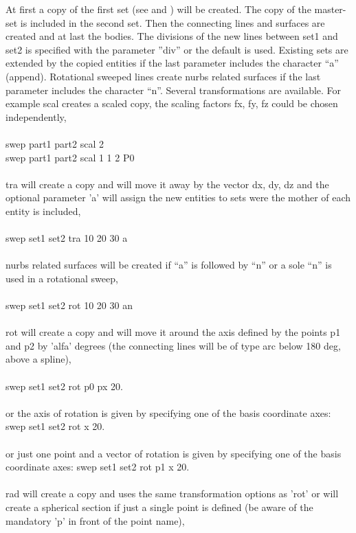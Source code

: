 \documentclass{article}
\begin{document}
At first a copy of the first set (see  and ) will be created. The copy of the master-set is included in the second set. Then the connecting lines and surfaces are created and at last the bodies. The divisions of the new lines between set1 and set2 is specified with the parameter ''div'' or the default is used. Existing sets are extended by the copied entities if the last parameter includes the character ``a'' (append). Rotational sweeped lines create nurbs related surfaces if the last parameter includes the character ``n''. Several transformations are available. For example scal creates a scaled copy, the scaling factors fx, fy, fz could be chosen independently,\\\\
swep part1 part2 scal 2 \\
swep part1 part2 scal 1 1 2 P0\\\\
tra will create a copy and will move it away by the vector dx, dy, dz and the optional parameter 'a' will assign the new entities to sets were the mother of each entity is included,\\\\
swep set1 set2 tra 10 20 30 a\\\\
nurbs related surfaces will be created if ``a'' is followed by ``n'' or a sole ``n'' is used in a rotational sweep,\\\\ 
swep set1 set2 rot 10 20 30 an\\\\
rot will create a copy and will move it around the axis defined by the points p1 and p2 by 'alfa' degrees (the connecting lines will be of type arc below 180 deg, above a spline),\\\\
swep set1 set2 rot p0 px 20.\\\\
or the axis of rotation is given by specifying one of the basis coordinate axes:
swep set1 set2 rot x 20.\\\\
or just one point and a vector of rotation is given by specifying one of the basis coordinate axes:
swep set1 set2 rot p1 x 20.\\\\
rad will create a copy and uses the same transformation options as 'rot' or will create a spherical section if just a single point is defined (be aware of the mandatory 'p' in front of the point name),\\\\
\end{document}

